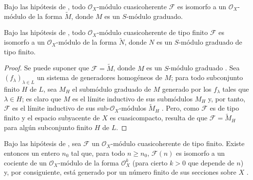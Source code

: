 \documentclass[oneside,10pt]{amsart}
\renewcommand{\geq}{\geqslant}
\let\EGAOriginalLabel\label
\renewcommand{\label}[1]{\phantomsection\EGAOriginalLabel{#1}}
\begin{document}
\begin{corollary}[2.7.7]
\label{II.2.7.7-fr}
Bajo las hipótesis de , todo $\mathcal{O}_X$-módulo cuasicoherente $\mathcal{F}$ es isomorfo a un $\mathcal{O}_X$-módulo de la forma $\widetilde{M}$, donde $M$ es un $S$-módulo graduado.
\end{corollary}

\begin{corollary}[2.7.8]
\label{II.2.7.8-fr}
Bajo las hipótesis de , todo $\mathcal{O}_X$-módulo cuasicoherente de tipo finito $\mathcal{F}$ es isomorfo a un $\mathcal{O}_X$-módulo de la forma $\widetilde{N}$, donde $N$ es un $S$-módulo graduado de tipo finito.
\end{corollary}

\begin{proof}
Se puede suponer que $\mathcal{F}=\widetilde{M}$, donde $M$ es un $S$-módulo graduado .
Sea $(f_\lambda)_{\lambda\in L}$ un sistema de generadores homogéneos de $M$; para todo subconjunto finito $H$ de $L$, sea $M_H$ el submódulo graduado de $M$ generado por los $f_\lambda$ tales que $\lambda\in H$; es claro que $M$ es el límite inductivo de sus submódulos $M_H$ y, por tanto, $\mathcal{F}$ es el límite inductivo de sus sub-$\mathcal{O}_X$-módulos $\widetilde{M}_H$ .
Pero, como $\mathcal{F}$ es de tipo finito y el espacio subyacente de $X$ es cuasicompacto, resulta de  que $\mathcal{F}=\widetilde{M}_H$ para algún subconjunto finito $H$ de $L$.
\end{proof}

\begin{corollary}[2.7.9]
\label{II.2.7.9-fr}
Bajo las hipótesis de , sea $\mathcal{F}$ un $\mathcal{O}_X$-módulo cuasicoherente de tipo finito.
Existe entonces un entero $n_0$ tal que, para todo $n\geq n_0$, $\mathcal{F}(n)$ es isomorfo a un cociente de un $\mathcal{O}_X$-módulo de la forma $\mathcal{O}_X^k$ (para cierto $k>0$ que depende de $n$) y, por consiguiente, está generado por un número finito de sus secciones sobre $X$ .
\end{corollary}
\end{document}
